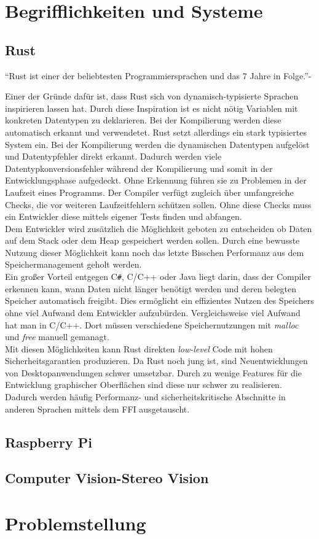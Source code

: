 
\section{Begrifflichkeiten und Systeme}

\subsection{Rust}

"`Rust ist einer der beliebtesten Programmiersprachen und das 7 Jahre in Folge."'-\cite{stack_rust}

Einer der Gründe dafür ist, dass Rust sich von dynamisch-typisierte
Sprachen inspirieren lassen hat. Durch diese Inspiration
ist es nicht nötig
Variablen mit konkreten Datentypen zu deklarieren. Bei der
Kompilierung werden diese automatisch erkannt und verwendetet.
Rust setzt allerdings ein stark typisiertes System ein.
Bei der Kompilierung werden die dynamischen Datentypen aufgelöst
und Datentypfehler direkt erkannt.
Dadurch werden viele Datentypkonversionsfehler während der Kompilierung und somit
in der Entwicklungsphase aufgedeckt. Ohne Erkennung führen
sie zu Problemen in der Laufzeit eines Programms.
Der Compiler verfügt zugleich über umfangreiche
Checks, die vor weiteren Laufzeitfehlern schützen sollen.
Ohne diese Checks muss ein Entwickler diese mittels eigener Tests finden und abfangen.
\\
Dem Entwickler wird zusätzlich die Möglichkeit geboten zu entscheiden
ob Daten auf dem Stack oder dem Heap
gespeichert werden sollen. Durch eine bewusste Nutzung
dieser Möglichkeit kann noch das letzte Bisschen
Performanz aus dem Speichermanagement geholt werden.
\\
Ein großer Vorteil entgegen C\verb|#|, C/C++ oder Java liegt darin, dass
der Compiler erkennen kann, wann Daten nicht länger benötigt werden
und deren belegten Speicher automatisch freigibt. Dies ermöglicht ein effizientes
Nutzen des Speichers ohne viel Aufwand dem Entwickler aufzubürden.
Vergleichsweise viel Aufwand hat man in C/C++. Dort müssen
verschiedene Speichernutzungen mit \emph{malloc} und \emph{free} manuell gemanagt.
\\
Mit diesen Möglichkeiten kann Rust direkten \emph{low-level} Code mit
hohen Sicherheitsgarantien produzieren.
Da Rust noch jung ist, sind Neuentwicklungen
von Desktopanwendungen schwer umsetzbar. Durch zu wenige
Features für die Entwicklung graphischer Oberflächen sind diese
nur schwer zu realisieren. Dadurch
werden häufig Performanz- und sicherheitskritische
Abschnitte in anderen Sprachen mittels
dem \acf{FFI} ausgetauscht. \cite{rust_overflow_blog}


\subsection{Raspberry Pi}

\subsection{Computer Vision-Stereo Vision}

\section{Problemstellung}

